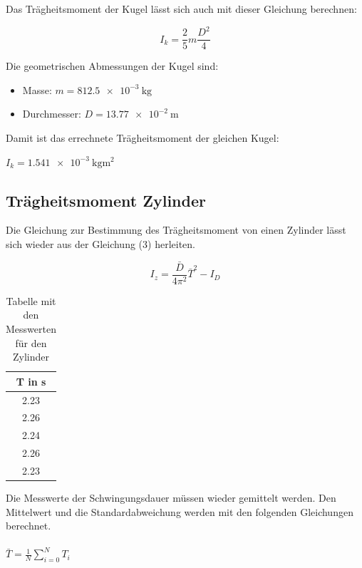 Das Trägheitsmoment der Kugel lässt sich auch mit dieser Gleichung berechnen:

\begin{equation}
I_k = \frac{2}{5} m \frac{D^2}{4}
\end{equation}

Die geometrischen Abmessungen der Kugel sind:

\begin{itemize}
  \item Masse: $m = \SI{812.5e-3}{\kilo\gram}$
  \item Durchmesser: $D = \SI{13.77e-2}{\meter}$
\end{itemize}

Damit ist das errechnete Trägheitsmoment der gleichen Kugel:

\centerline{$I_k = \SI{1.541e-3}{\kilo\gram\meter\squared}$}

\subsection{Trägheitsmoment Zylinder}

Die Gleichung zur Bestimmung des Trägheitsmoment von einen Zylinder lässt sich wieder
aus der Gleichung (3) herleiten.

\begin{equation}
  I_z = \frac{\bar{D}}{4\pi^2}\bar{T}^2 - I_D
\end{equation}

\begin{table}[H]
  \centering
  \caption{Tabelle mit den Messwerten für den Zylinder}
  \begin{tabular}{c}
    \toprule
    T in \si{\second} \\
    \midrule
    2.23 \\
    2.26 \\
    2.24 \\
    2.26 \\
    2.23 \\
    \bottomrule
  \end{tabular}
\end{table}

Die Messwerte der Schwingungsdauer müssen wieder gemittelt werden. Den Mittelwert
und die Standardabweichung werden mit den folgenden Gleichungen berechnet. \\\\

$\bar{T} = \frac{1}{N} \sum_{i=0}^{N} T_i$ \\\\

